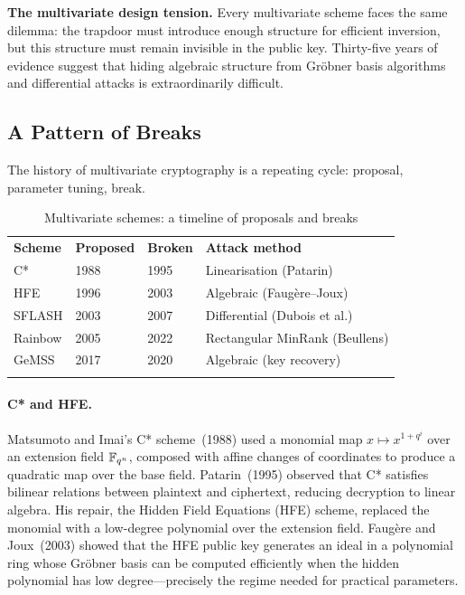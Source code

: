 \begin{svgraybox}
\textbf{The multivariate design tension.}  Every multivariate scheme faces the same dilemma: the trapdoor must introduce enough structure for efficient inversion, but this structure must remain invisible in the public key.  Thirty-five years of evidence suggest that hiding algebraic structure from Gr\"obner basis algorithms and differential attacks is extraordinarily difficult.
\end{svgraybox}


\subsection{A Pattern of Breaks}
\label{subsec:multivariate-breaks}

The history of multivariate cryptography is a repeating cycle: proposal, parameter tuning, break.

\begin{table}[t]
\caption{Multivariate schemes: a timeline of proposals and breaks}
\label{tab:multivariate-timeline}
\begin{tabular}{p{2.5cm}p{2cm}p{2cm}p{5cm}}
\hline\noalign{\smallskip}
\textbf{Scheme} & \textbf{Proposed} & \textbf{Broken} & \textbf{Attack method} \\
\noalign{\smallskip}\svhline\noalign{\smallskip}
C*              & 1988 & 1995 & Linearisation (Patarin) \\
HFE             & 1996 & 2003 & Algebraic (Faug\`ere--Joux) \\
SFLASH          & 2003 & 2007 & Differential (Dubois et al.) \\
Rainbow         & 2005 & 2022 & Rectangular MinRank (Beullens) \\
GeMSS           & 2017 & 2020 & Algebraic (key recovery) \\
\noalign{\smallskip}\hline
\end{tabular}
\end{table}

\paragraph{C* and HFE.}
Matsumoto and Imai's C* scheme~(1988) used a monomial map $x \mapsto x^{1+q^i}$ over an extension field $\mathbb{F}_{q^n}$, composed with affine changes of coordinates to produce a quadratic map over the base field.  Patarin~(1995) observed that C* satisfies bilinear relations between plaintext and ciphertext, reducing decryption to linear algebra.  His repair, the Hidden Field Equations (HFE) scheme, replaced the monomial with a low-degree polynomial over the extension field.  Faug\`ere and Joux~(2003) showed that the HFE public key generates an ideal in a polynomial ring whose Gr\"obner basis can be computed efficiently when the hidden polynomial has low degree---precisely the regime needed for practical parameters.

